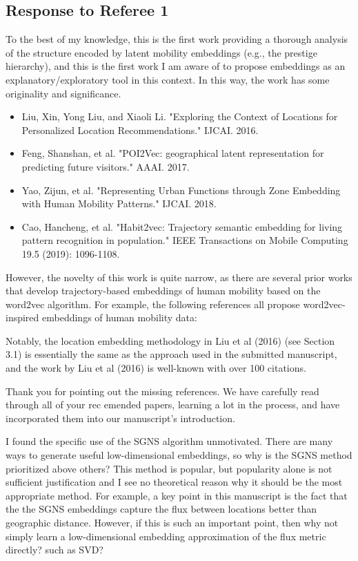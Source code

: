 \documentclass[12pt,a4paper]{article}
\newcommand{\response}[1]{{\noindent #1}}
\newcommand{\rcomment}[1]{%
\vspace{10pt}
\begin{tcolorbox}[colback=black!3,colframe=white!45!black, left=0pt, right=0pt, top=0pt, bottom=0pt, arc=0pt,outer arc=0pt, grow to left by=-0.5cm,grow to right by=-0.5cm]
#1
\end{tcolorbox}
}
\begin{document}
\subsection{Response to Referee 1}


\rcomment{%
To the best of my knowledge, this is the first work providing a thorough analysis of the structure encoded by latent mobility embeddings (e.g., the prestige hierarchy), and this is the first work I am aware of to propose embeddings as an explanatory/exploratory tool in this context. In this way, the work has some originality and significance.

\begin{itemize}
	\item Liu, Xin, Yong Liu, and Xiaoli Li. "Exploring the Context of Locations for Personalized Location Recommendations." IJCAI. 2016.
\item Feng, Shanshan, et al. "POI2Vec: geographical latent representation for predicting future visitors." AAAI. 2017.
\item Yao, Zijun, et al. "Representing Urban Functions through Zone Embedding with Human Mobility Patterns." IJCAI. 2018.
\item Cao, Hancheng, et al. "Habit2vec: Trajectory semantic embedding for living pattern recognition in population." IEEE Transactions on Mobile Computing 19.5 (2019): 1096-1108.
\end{itemize}


However, the novelty of this work is quite narrow, as there are several prior works that develop trajectory-based embeddings of human mobility based on the word2vec algorithm. For example, the following references all propose word2vec-inspired embeddings of human mobility data:


Notably, the location embedding methodology in Liu et al (2016) (see Section 3.1) is essentially the same as the approach used in the submitted manuscript, and the work by Liu et al (2016) is well-known with over 100 citations.
}



\response{Thank you for pointing out the missing references. 
We have carefully read through all of your rec emended papers, learning a lot in the process, and have incorporated them into our manuscript's introduction.
}

\rcomment{
I found the specific use of the SGNS algorithm unmotivated. There are many ways to generate useful low-dimensional embeddings, so why is the SGNS method prioritized above others? This method is popular, but popularity alone is not sufficient justification and I see no theoretical reason why it should be the most appropriate method. For example, a key point in this manuscript is the fact that the the SGNS embeddings capture the flux between locations better than geographic distance. However, if this is such an important point, then why not simply learn a low-dimensional embedding approximation of the flux metric directly? such as SVD?
}
\end{document}
